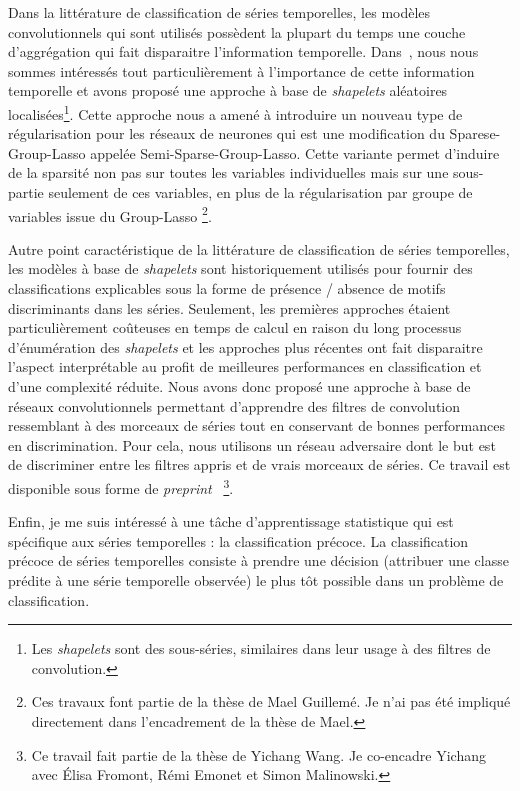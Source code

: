 Dans la littérature de classification de séries temporelles, les modèles
convolutionnels qui sont utilisés possèdent la plupart du temps une couche
d'aggrégation qui fait disparaitre l'information temporelle.
Dans~\cite{guilleme:hal-02513295}, nous nous sommes intéressés tout
particulièrement à l'importance de cette information temporelle et avons
proposé une approche à base de \emph{shapelets}
aléatoires localisées\footnote{Les \emph{shapelets} sont des sous-séries,
similaires dans leur usage à des filtres de convolution.}.
Cette approche nous a amené à introduire un nouveau type de régularisation pour
les réseaux de neurones qui est une modification du Sparese-Group-Lasso appelée
Semi-Sparse-Group-Lasso.
Cette variante permet d'induire de la sparsité non pas sur toutes les variables
individuelles mais sur une sous-partie seulement de ces variables,
en plus de la régularisation
par groupe de variables issue du Group-Lasso%
\footnote{Ces travaux font partie de la thèse de Mael Guillemé.
Je n'ai pas été impliqué directement dans l'encadrement de la thèse de Mael.}.

Autre point caractéristique de la littérature de classification de séries
temporelles, les modèles à base de \emph{shapelets} sont historiquement utilisés
pour fournir des classifications explicables sous la forme de présence / absence
de motifs discriminants dans les séries.
Seulement, les premières approches étaient particulièrement coûteuses en temps
de calcul en raison du long processus d'énumération des \emph{shapelets} et les
approches plus récentes ont fait disparaitre l'aspect interprétable au profit
de meilleures performances en classification et d'une complexité réduite.
Nous avons donc proposé une approche à base de réseaux convolutionnels
permettant d'apprendre des filtres de convolution ressemblant à des morceaux
de séries tout en conservant de bonnes performances en discrimination.
Pour cela, nous utilisons un réseau adversaire dont le but est de discriminer
entre les filtres appris et de vrais morceaux de séries.
Ce travail est disponible sous forme de \emph{preprint}~\cite{wang2019}%
\footnote{Ce travail fait partie de la thèse de Yichang Wang.
Je co-encadre Yichang avec Élisa Fromont, Rémi Emonet et Simon
Malinowski.}.

\haveabreak{}

Enfin, je me suis intéressé à une tâche d'apprentissage statistique qui est
spécifique aux séries temporelles : la classification précoce.
La classification précoce de séries temporelles consiste à prendre une décision
(attribuer une classe prédite à une série temporelle observée) le plus tôt
possible dans un problème de classification.

